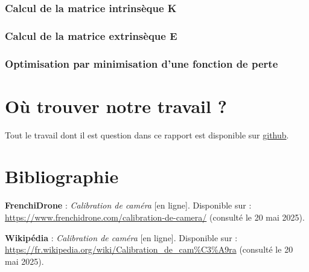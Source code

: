 \documentclass[12pt]{article}
\begin{document}
\subsubsection{Calcul de la matrice intrinsèque K}

\subsubsection{Calcul de la matrice extrinsèque E}

\subsubsection{Optimisation par minimisation d'une fonction de perte}

\newpage

\section{Où trouver notre travail ?}

Tout le travail dont il est question dans ce rapport est disponible sur \href{https://github.com/antoinedenovembre/3d_reconstruction}{github}.

\newpage

\section{Bibliographie}

\noindent \textbf{FrenchiDrone} : \textit{Calibration de caméra} [en ligne]. Disponible sur : \url{https://www.frenchidrone.com/calibration-de-camera/} (consulté le 20 mai 2025).

\noindent \textbf{Wikipédia} : \textit{Calibration de caméra} [en ligne]. Disponible sur : \url{https://fr.wikipedia.org/wiki/Calibration_de_cam%C3%A9ra} (consulté le 20 mai 2025).
\end{document}
